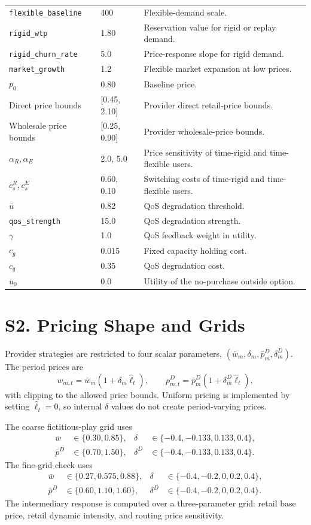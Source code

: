 \documentclass[11pt,a4paper]{article}
\begin{document}
\begin{longtable}{p{}p{}p{}}
\texttt{flexible\_baseline} & 400 & Flexible-demand scale. \\
\texttt{rigid\_wtp} & 1.80 & Reservation value for rigid or replay demand. \\
\texttt{rigid\_churn\_rate} & 5.0 & Price-response slope for rigid demand. \\
\texttt{market\_growth} & 1.2 & Flexible market expansion at low prices. \\
$p_0$ & 0.80 & Baseline price. \\
Direct price bounds & [0.45, 2.10] & Provider direct retail-price bounds. \\
Wholesale price bounds & [0.25, 0.90] & Provider wholesale-price bounds. \\
$\alpha_R,\alpha_E$ & 2.0, 5.0 & Price sensitivity of time-rigid and time-flexible users. \\
$c_s^R,c_s^E$ & 0.60, 0.10 & Switching costs of time-rigid and time-flexible users. \\
$\bar u$ & 0.82 & QoS degradation threshold. \\
\texttt{qos\_strength} & 15.0 & QoS degradation strength. \\
$\gamma$ & 1.0 & QoS feedback weight in utility. \\
$c_g$ & 0.015 & Fixed capacity holding cost. \\
$c_q$ & 0.35 & QoS degradation cost. \\
$u_0$ & 0.0 & Utility of the no-purchase outside option. \\
\bottomrule
\end{longtable}

\section*{S2. Pricing Shape and Grids}

Provider strategies are restricted to four scalar parameters,
$(\bar w_m,\delta_m,\bar p^D_m,\delta^D_m)$. The period prices are
\[
  w_{m,t}=\bar w_m(1+\delta_m\widehat{\ell}_t),\qquad
  p^D_{m,t}=\bar p^D_m(1+\delta^D_m\widehat{\ell}_t),
\]
with clipping to the allowed price bounds. Uniform pricing is implemented by
setting $\widehat{\ell}_t=0$, so internal $\delta$ values do not create
period-varying prices.

The coarse fictitious-play grid uses
\[
\begin{aligned}
\bar w&\in\{0.30,0.85\},&
\delta&\in\{-0.4,-0.133,0.133,0.4\},\\
\bar p^D&\in\{0.70,1.50\},&
\delta^D&\in\{-0.4,-0.133,0.133,0.4\}.
\end{aligned}
\]
The fine-grid check uses
\[
\begin{aligned}
\bar w&\in\{0.27,0.575,0.88\},&
\delta&\in\{-0.4,-0.2,0,0.2,0.4\},\\
\bar p^D&\in\{0.60,1.10,1.60\},&
\delta^D&\in\{-0.4,-0.2,0,0.2,0.4\}.
\end{aligned}
\]
The intermediary response is computed over a three-parameter grid: retail base
price, retail dynamic intensity, and routing price sensitivity.
\end{document}
